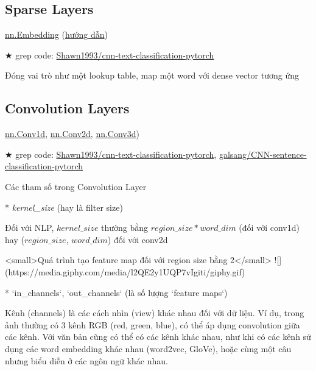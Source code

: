 \subsection{Sparse Layers}

\href{http://pytorch.org/docs/master/nn.html#embedding}{nn.Embedding} (\href{http://pytorch.org/tutorials/beginner/nlp/word_embeddings_tutorial.html}{hướng dẫn})

★ grep code: \href{https://github.com/Shawn1993/cnn-text-classification-pytorch/blob/master/model.py#L18}{Shawn1993/cnn-text-classification-pytorch}

Đóng vai trò như một lookup table, map một word với dense vector tương ứng

\subsection{Convolution Layers}


\href{http://pytorch.org/docs/master/nn.html#conv1d}{nn.Conv1d}, \href{http://pytorch.org/docs/master/nn.html#conv2d}{nn.Conv2d}, \href{http://pytorch.org/docs/master/nn.html#conv3d}{nn.Conv3d})

★ grep code: \href{https://github.com/Shawn1993/cnn-text-classification-pytorch/blob/master/model.py#L20-L24}{Shawn1993/cnn-text-classification-pytorch}, \href{https://github.com/galsang/CNN-sentence-classification-pytorch/blob/master/model.py#L36-L38}{galsang/CNN-sentence-classification-pytorch}

Các tham số trong Convolution Layer

* \textit{kernel\_size} (hay là filter size)

Đối với NLP, $kernel\_size$ thường bằng $region\_size * word\_dim$ (đối với conv1d) hay ($region\_size$, $word\_dim$) đối với conv2d

<small>Quá trình tạo feature map đối với region size bằng 2</small>
![](https://media.giphy.com/media/l2QE2y1UQP7vIgiti/giphy.gif)

* `in_channels`, `out_channels` (là số lượng `feature maps`)

Kênh (channels) là các cách nhìn (view) khác nhau đối với dữ liệu. Ví dụ, trong ảnh thường có 3 kênh RGB (red, green, blue), có thể áp dụng convolution giữa các kênh. Với văn bản cũng có thể có các kênh khác nhau, như khi có các kênh sử dụng các word embedding khác nhau (word2vec, GloVe), hoặc cùng một câu nhưng biểu diễn ở các ngôn ngữ khác nhau.

